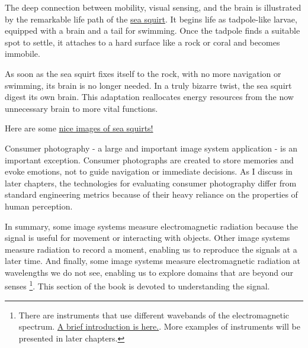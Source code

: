 \documentclass[
  letterpaper,
]{book}
\begin{document}
\begin{tcolorbox}[enhanced jigsaw, opacitybacktitle=0.6, breakable, bottomtitle=1mm, leftrule=.75mm, colframe=quarto-callout-note-color-frame, colback=white, left=2mm, opacityback=0, title=\textcolor{quarto-callout-note-color}{\faInfo}\hspace{0.5em}{Who needs a brain?}, toptitle=1mm, bottomrule=.15mm, titlerule=0mm, arc=.35mm, colbacktitle=quarto-callout-note-color!10!white, toprule=.15mm, rightrule=.15mm, coltitle=black]

The deep connection between mobility, visual sensing, and the brain is
illustrated by the remarkable life path of the
\href{https://movementum.co.uk/journal/sea-squirts}{sea squirt}. It
begins life as tadpole-like larvae, equipped with a brain and a tail for
swimming. Once the tadpole finds a suitable spot to settle, it attaches
to a hard surface like a rock or coral and becomes immobile.

As soon as the sea squirt fixes itself to the rock, with no more
navigation or swimming, its brain is no longer needed. In a truly
bizarre twist, the sea squirt digest its own brain. This adaptation
reallocates energy resources from the now unnecessary brain to more
vital functions.

Here are some
\href{https://goodheartextremescience.wordpress.com/2010/01/27/meet-the-creature-that-eats-its-own-brain/}{nice
images of sea squirts!}\\

\end{tcolorbox}

Consumer photography - a large and important image system application -
is an important exception. Consumer photographs are created to store
memories and evoke emotions, not to guide navigation or immediate
decisions. As I discuss in later chapters, the technologies for
evaluating consumer photography differ from standard engineering metrics
because of their heavy reliance on the properties of human perception.

In summary, some image systems measure electromagnetic radiation because
the signal is useful for movement or interacting with objects. Other
image systems measure radiation to record a moment, enabling us to
reproduce the signals at a later time. And finally, some image systems
measure electromagnetic radiation at wavelengths we do not see, enabling
us to explore domains that are beyond our senses \footnote{There are
  instruments that use different wavebands of the electromagnetic
  spectrum. \href{resources/lightfields-wavebands.html}{A brief
  introduction is here.}. More examples of instruments will be presented
  in later chapters.}. This section of the book is devoted to
understanding the signal.
\end{document}
